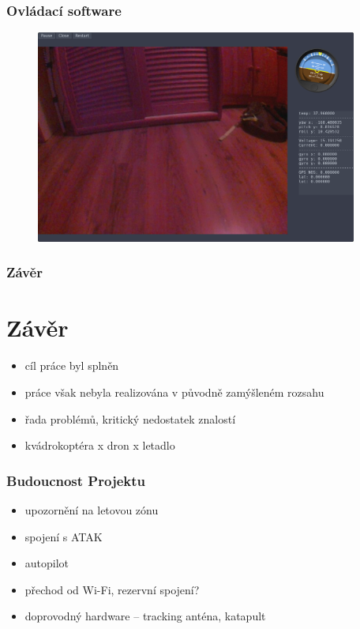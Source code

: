 \documentclass[aspectratio=43]{beamer}
\begin{document}
\begin{frame}[fragile]
	\frametitle{Ovládací software}
	\begin{figure}[h]
		\centering
		\includegraphics[height=7cm]{./../img/interface.png}
	\end{figure}
\end{frame}


\begin{frame}[fragile]
	\frametitle{Závěr}
	\section{Závěr}
	\begin{itemize}
		\item cíl práce byl splněn
		\item práce však nebyla realizována v původně zamýšleném rozsahu
		\item řada problémů, kritický nedostatek znalostí
		\item kvádrokoptéra x dron x letadlo
	\end{itemize}
\end{frame}

\begin{frame}[fragile]
	\frametitle{Budoucnost Projektu}
	\begin{itemize}
		\item upozornění na letovou zónu
		\item spojení s ATAK
		\item autopilot
		\item přechod od Wi-Fi, rezervní spojení?
		\item doprovodný hardware -- tracking anténa, katapult
	\end{itemize}
\end{frame}
\end{document}
